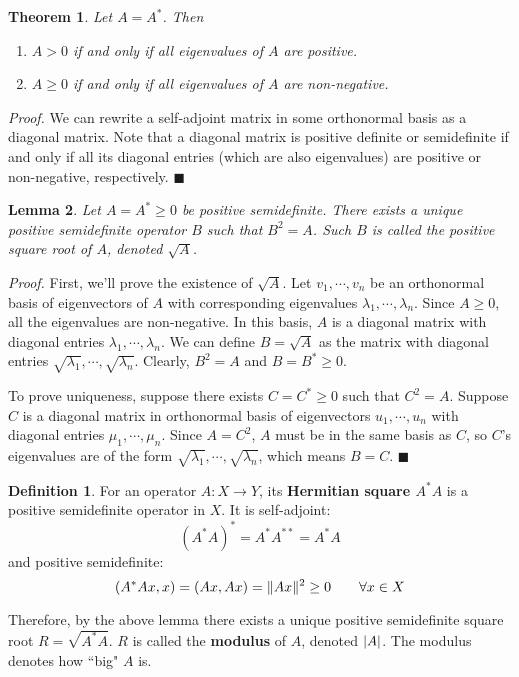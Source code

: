 \documentclass[a4paper,10pt]{book}
\theoremstyle{plain}
\newtheorem{theorem}{Theorem}[section]
\renewenvironment{proof}{\textsl{Proof.}}{\hfill$\blacksquare$}
\theoremstyle{plain}
\newtheorem{lemma}[theorem]{Lemma}
\newenvironment{lproof}{\textsl{Proof.}}{\hfill$\blacksquare$}
\theoremstyle{definition}
\newtheorem{definition}{Definition}[section]
\begin{document}
\begin{theorem}
Let $A = A^{*}$. Then 
\begin{enumerate}
	\item $A > 0$ if and only if all eigenvalues of $A$ are positive. 
	\item $A \geq 0$ if and only if all eigenvalues of $A$ are non-negative. 
\end{enumerate}
\end{theorem}

\begin{proof}
We can rewrite a self-adjoint matrix in some orthonormal basis as a diagonal matrix. Note that a diagonal matrix is positive definite or semidefinite if and only if all its diagonal entries (which are also eigenvalues) are positive or non-negative, respectively.  
\end{proof}

\begin{lemma}
Let $A = A^{*} \geq 0$ be positive semidefinite. There exists a unique positive semidefinite operator $B$ such that $B^{2} = A$. Such $B$ is called the positive square root of $A$, denoted $\sqrt{A}$.
\end{lemma}

\begin{lproof}
First, we'll prove the existence of $\sqrt{A}$. Let $v_{1}, \cdots, v_{n}$ be an orthonormal basis of eigenvectors of $A$ with corresponding eigenvalues $\lambda_{1}, \cdots, \lambda_{n}$. Since $A \geq 0$, all the eigenvalues are non-negative. In this basis, $A$ is a diagonal matrix with diagonal entries $\lambda_{1}, \cdots, \lambda_{n}$. We can define $B =\sqrt{A}$ as the matrix with diagonal entries $\sqrt{\lambda_{1}}, \cdots, \sqrt{\lambda_{n}}$. Clearly, $B^{2} = A$ and $B = B^{*} \geq 0$. 

To prove uniqueness, suppose there exists $C = C^{*} \geq 0$ such that $C^{2} = A$. Suppose $C$ is a diagonal matrix in orthonormal basis of eigenvectors $u_{1}, \cdots, u_{n}$ with diagonal entries $\mu_{1}, \cdots, \mu_{n}$. Since $A = C^{2}$, $A$ must be in the same basis as $C$, so $C$'s eigenvalues are of the form $\sqrt{\lambda_{1}}, \cdots, \sqrt{\lambda_{n}}$, which means $B = C$. 
\end{lproof}

\begin{definition}
For an operator $A: X \rightarrow Y$, its \textbf{Hermitian square $A^{*} A$} is a positive semidefinite operator in $X$. It is self-adjoint:
$$(A^{*} A)^{*} = A^{*} A^{**} = A^{*} A$$
and positive semidefinite:
$$(A^{*} Ax, x) = (Ax, Ax) = \lVert Ax\rVert^{2} \geq 0 \qquad \forall x \in X$$

Therefore, by the above lemma there exists a unique positive semidefinite square root $R = \sqrt{A^{*} A}$. $R$ is called the \textbf{modulus} of $A$, denoted $\lvert A\rvert$. The modulus denotes how ``big" $A$ is. 
\end{definition}
\end{document}
